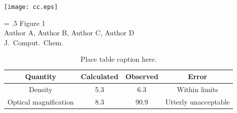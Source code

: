\documentclass[12pt]{article}
\begin{document}




\clearpage

\begin{center}
\texttt{[image: cc.eps]}
\end{center}
\vspace{0.25in}
\hspace*{3in}
{\Large
\begin{minipage}[t]{3in}
\baselineskip = .5\baselineskip
Figure 1 \\
Author A, Author B, Author C, Author D \\
J.\ Comput.\ Chem.
\end{minipage}
}

\clearpage

\begin{table}
\begin{tabular}{|c|c|c|c|}\hline
\textbf{Quantity} & \textbf{Calculated} & \textbf{Observed} & \textbf{Error} \\ \hline
  Density & 5.3 & 6.3 & Within limits \\ \hline
  Optical magnification & 8.3 & 90.9 & Utterly unacceptable\! \\ \hline
\end{tabular}
\caption{\label{tbl1} Place table caption here.}
\end{table}
\end{document}
